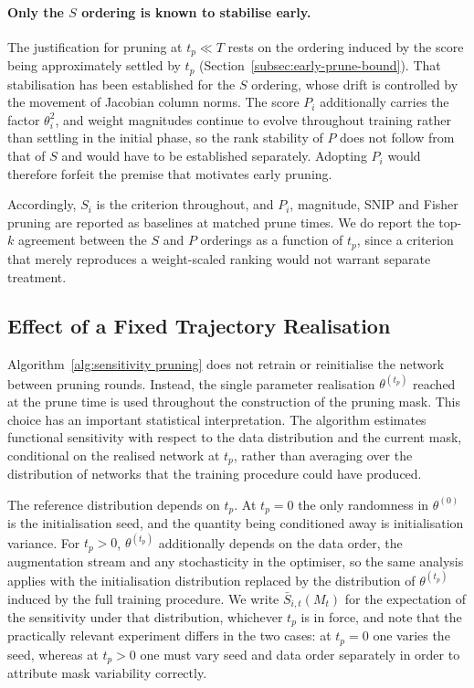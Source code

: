 \documentclass{article}
\theoremstyle{definition}
\theoremstyle{remark}
\begin{document}
\paragraph{Only the $S$ ordering is known to stabilise early.} The
justification for pruning at $t_p\ll T$ rests on the ordering induced by the
score being approximately settled by $t_p$
(Section~\ref{subsec:early-prune-bound}). That stabilisation has been
established for the $S$ ordering, whose drift is controlled by the movement of
Jacobian column norms. The score $P_i$ additionally carries the factor
$\theta_i^2$, and weight magnitudes continue to evolve throughout training
rather than settling in the initial phase, so the rank stability of $P$ does not
follow from that of $S$ and would have to be established separately. Adopting
$P_i$ would therefore forfeit the premise that motivates early pruning.

Accordingly, $S_i$ is the criterion throughout, and $P_i$, magnitude, SNIP and
Fisher pruning are reported as baselines at matched prune times. We do report
the top-$k$ agreement between the $S$ and $P$ orderings as a function of $t_p$,
since a criterion that merely reproduces a weight-scaled ranking would not
warrant separate treatment.

\subsection{Effect of a Fixed Trajectory Realisation}
\label{subsec:fixed_initialisation}

Algorithm~\ref{alg:sensitivity pruning} does not retrain or reinitialise the
network between pruning rounds. Instead, the single parameter realisation
$\theta^{(t_p)}$ reached at the prune time is used throughout the construction
of the pruning mask. This choice has an important statistical interpretation.
The algorithm estimates functional sensitivity with respect to the data
distribution and the current mask, conditional on the realised network at
$t_p$, rather than averaging over the distribution of networks that the
training procedure could have produced.

The reference distribution depends on $t_p$. At $t_p=0$ the only randomness in
$\theta^{(0)}$ is the initialisation seed, and the quantity being conditioned
away is initialisation variance. For $t_p>0$, $\theta^{(t_p)}$ additionally
depends on the data order, the augmentation stream and any stochasticity in the
optimiser, so the same analysis applies with the initialisation distribution
replaced by the distribution of $\theta^{(t_p)}$ induced by the full training
procedure. We write $\bar S_{i,t}(M_t)$ for the expectation of the sensitivity
under that distribution, whichever $t_p$ is in force, and note that the
practically relevant experiment differs in the two cases: at $t_p=0$ one varies
the seed, whereas at $t_p>0$ one must vary seed and data order separately in
order to attribute mask variability correctly.
\end{document}
